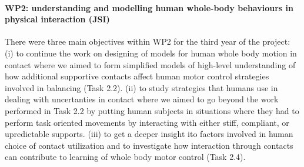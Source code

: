 \paragraph{WP2: understanding and modelling human whole-body behaviours in physical interaction (JSI)}

There were three main objectives within WP2 for the third year of the project: (i) to continue the work on designing of models for human whole body motion in contact where we aimed to form simplified models of high-level understanding of how additional supportive contacts affect human motor control strategies involved in balancing (Task 2.2). (ii) to study strategies that humans use in dealing with uncertanties in contact where we aimed to go beyond the work performed in Task 2.2 by putting human subjects in situations where they had to perform task oriented movements by interacting with either stiff, compliant, or upredictable supports. (iii) to get a deeper insight ito factors involved in human choice of contact utilization and to investigate how interaction through contacts can contribute to learning of whole body motor control (Task 2.4).
